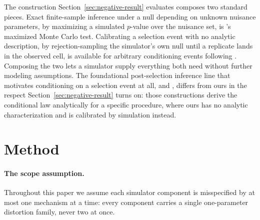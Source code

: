\documentclass{article}
\begin{document}
The construction Section~\ref{sec:negative-result} evaluates composes two standard pieces. Exact finite-sample
inference under a null depending on unknown nuisance parameters, by maximizing a simulated
$p$-value over the nuisance set, is \citet{Dufour_2006}'s maximized Monte Carlo test.
Calibrating a selection event with no analytic description, by rejection-sampling the
simulator's own null until a replicate lands in the observed cell, is available for arbitrary
conditioning events following \citet{freidling2026selectiverandomizationinferenceadaptive}.
Composing the two lets a simulator supply everything both need without further modeling
assumptions. The foundational post-selection inference line that motivates conditioning on a
selection event at all, \citet{fithian2017optimalinferencemodelselection} and
\citet{Lee_2016}, differs from ours in the respect
Section~\ref{sec:negative-result} turns on: those constructions derive the conditional law
analytically for a specific procedure, where ours has no analytic characterization and is
calibrated by simulation instead.

\section{Method}
\label{sec:method}

\paragraph{The scope assumption.}
Throughout this paper we assume each simulator component is misspecified by at most one
mechanism at a time: every component carries a single one-parameter distortion family, never
two at once.
\end{document}
